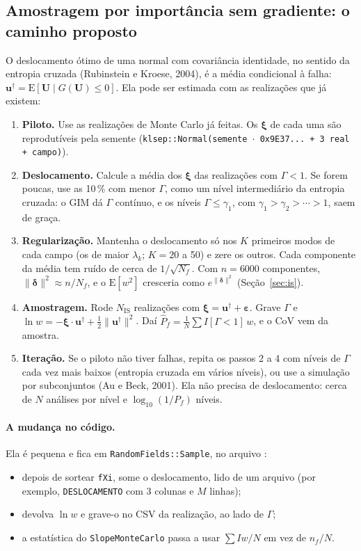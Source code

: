 \documentclass[11pt,a4paper]{article}
\newcommand{\E}{\mathrm{E}}
\begin{document}
\subsection{Amostragem por importância sem gradiente: o caminho proposto}
\label{sec:proposta}

O deslocamento ótimo de uma normal com covariância identidade, no sentido da entropia cruzada (Rubinstein e Kroese,
2004), é a média condicional à falha: $\bm u^\dagger = \E[\bm U \mid G(\bm U) \leq 0]$. Ela pode ser estimada com as
realizações que já existem:
\begin{enumerate}
  \item \textbf{Piloto.} Use as realizações de Monte Carlo já feitas. Os $\bm\xi$ de cada uma são reprodutíveis pela
    semente (\texttt{klsep::Normal(semente $\cdot$ 0x9E37... + 3 real + campo)}).
  \item \textbf{Deslocamento.} Calcule a média dos $\bm\xi$ das realizações com $\Gamma < 1$. Se forem poucas,
    use as 10\,\% com menor $\Gamma$, como um nível intermediário da entropia cruzada: o GIM dá $\Gamma$ contínuo, e os
    níveis $\Gamma \leq \gamma_1$, com $\gamma_1 > \gamma_2 > \cdots > 1$, saem de graça.
  \item \textbf{Regularização.} Mantenha o deslocamento só nos $K$ primeiros modos de cada campo (os de maior
    $\lambda_k$; $K = 20$ a 50) e zere os outros. Cada componente da média tem ruído de cerca de $1/\sqrt{N_f}$. Com
    $n = 6000$ componentes, $\|\bm\delta\|^2 \approx n/N_f$, e o $\E[w^2]$ cresceria como $e^{\|\bm\delta\|^2}$
    (Seção~\ref{sec:is}).
  \item \textbf{Amostragem.} Rode $N_{\mathrm{IS}}$ realizações com $\bm\xi = \bm u^\dagger + \bm\varepsilon$. Grave
    $\Gamma$ e $\ln w = -\bm\xi\cdot\bm u^\dagger + \frac12\|\bm u^\dagger\|^2$. Daí
    $\hat P_f = \frac1N\sum I[\Gamma < 1]\,w$, e o CoV vem da amostra.
  \item \textbf{Iteração.} Se o piloto não tiver falhas, repita os passos 2 a 4 com níveis de $\Gamma$ cada vez mais
    baixos (entropia cruzada em vários níveis), ou use a simulação por subconjuntos (Au e Beck, 2001). Ela não precisa
    de deslocamento: cerca de $N$ análises por nível e $\log_{10}(1/P_f)$ níveis.
\end{enumerate}

\paragraph{A mudança no código.} Ela é pequena e fica em \texttt{RandomFields::Sample}, no arquivo
:
\begin{itemize}
  \item depois de sortear \texttt{fXi}, some o deslocamento, lido de um arquivo (por exemplo, \texttt{DESLOCAMENTO}
    com 3 colunas e $M$ linhas);
  \item devolva $\ln w$ e grave-o no CSV da realização, ao lado de $\Gamma$;
  \item a estatística do \texttt{SlopeMonteCarlo} passa a usar $\sum I w/N$ em vez de $n_f/N$.
\end{itemize}
\end{document}

